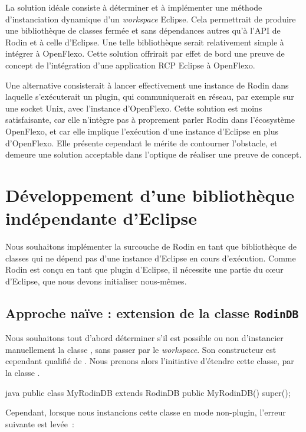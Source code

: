 La solution idéale consiste à déterminer et à implémenter une méthode d'instanciation dynamique d'un \textit{workspace} Eclipse.
Cela permettrait de produire une bibliothèque de classes fermée et sans dépendances autres qu'à l'API de Rodin et à celle d'Eclipse.
Une telle bibliothèque serait relativement simple à intégrer à OpenFlexo.
Cette solution offrirait par effet de bord une preuve de concept de l'intégration d'une application RCP Eclipse à OpenFlexo.

Une alternative consisterait à lancer effectivement une instance de Rodin dans laquelle s'exécuterait un plugin, qui communiquerait %
en réseau, par exemple sur une socket Unix, avec l'instance d'OpenFlexo.
Cette solution est moins satisfaisante, car elle n'intègre pas à proprement parler Rodin dans l'écosystème OpenFlexo, et car elle implique l'exécution %
d'une instance d'Eclipse en plus d'OpenFlexo.
Elle présente cependant le mérite de contourner l'obstacle, et demeure une solution acceptable dans l'optique de réaliser une preuve de concept.


\section{Développement d'une bibliothèque indépendante d'Eclipse}

Nous souhaitons implémenter la surcouche de Rodin en tant que bibliothèque de classes qui ne dépend pas d'une instance d'Eclipse en cours d'exécution.
Comme Rodin est conçu en tant que plugin d'Eclipse, il nécessite une partie du cœur d'Eclipse, que nous devons initialiser nous-mêmes.

\subsection{Approche naïve : extension de la classe \texttt{RodinDB}}

Nous souhaitons tout d'abord déterminer s'il est possible ou non d'instancier manuellement la classe , sans passer par le \textit{workspace}.
Son constructeur est cependant qualifié de .
Nous prenons alors l'initiative d'étendre cette classe, par la classe .

\begin{imtaCode}{java}
public class MyRodinDB extends RodinDB {
    public MyRodinDB() {
        super();
    }
}
\end{imtaCode}

Cependant, lorsque nous instancions cette classe en mode non-plugin, l'erreur suivante est levée~:

